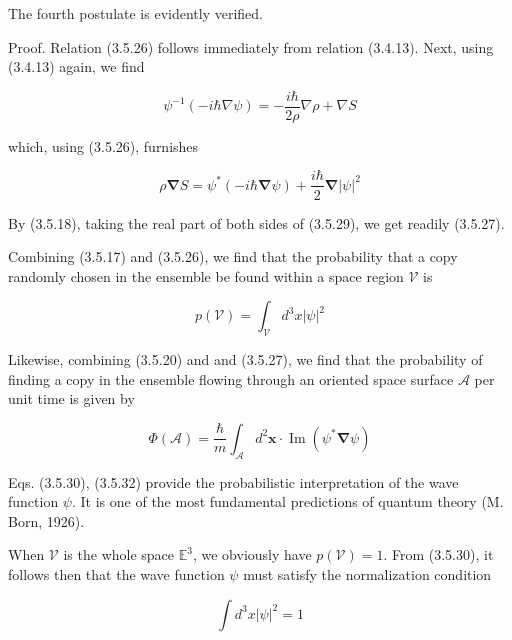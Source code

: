 \documentclass{article}
\begin{document}
The fourth postulate is evidently verified.

Proof. Relation (3.5.26) follows immediately from relation (3.4.13).
Next, using (3.4.13) again, we find
 
\begin{equation*}
\psi^{-1}(-i \hbar \nabla \psi)=-\frac{i \hbar}{2 \rho} \nabla \rho+\nabla S \tag{3.5.28}
\end{equation*}
 
which, using (3.5.26), furnishes
 
\begin{equation*}
\rho \boldsymbol{\nabla} S=\psi^{*}(-i \hbar \boldsymbol{\nabla} \psi)+\frac{i \hbar}{2} \boldsymbol{\nabla}|\psi|^{2} \tag{3.5.29}
\end{equation*}
 

By (3.5.18), taking the real part of both sides of (3.5.29), we get readily (3.5.27).

Combining (3.5.17) and (3.5.26), we find that the probability that a copy randomly chosen in the ensemble be found within a space region $\mathcal{V}$ is
 
\begin{equation*}
p(\mathcal{V})=\int_{\mathcal{V}} d^{3} x|\psi|^{2} \tag{3.5.30}
\end{equation*}
 

Likewise, combining (3.5.20) and and (3.5.27), we find that the probability of finding a copy in the ensemble flowing through an oriented space surface $\mathcal{A}$ per unit time is given by
 
\begin{equation*}
\Phi(\mathcal{A})=\frac{\hbar}{m} \int_{\mathcal{A}} d^{2} \boldsymbol{x} \cdot \operatorname{Im}\left(\psi^{*} \boldsymbol{\nabla} \psi\right) \tag{3.5.31}
\end{equation*}
 

Eqs. (3.5.30), (3.5.32) provide the probabilistic interpretation of the wave function $\psi$. It is one of the most fundamental predictions of quantum theory (M. Born, 1926).

When $\mathcal{V}$ is the whole space $\mathbb{E}^{3}$, we obviously have $p(\mathcal{V})=1$. From (3.5.30), it follows then that the wave function $\psi$ must satisfy the normalization condition
 
\begin{equation*}
\int d^{3} x|\psi|^{2}=1 \tag{3.5.32}
\end{equation*}
 
\end{document}
